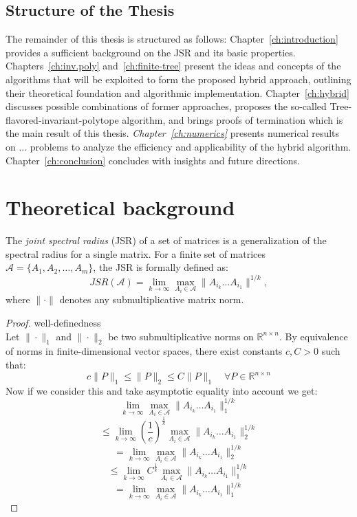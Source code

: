 \subsection*{Structure of the Thesis}
The remainder of this thesis is structured as follows: Chapter~\ref{ch:introduction} provides a sufficient background on the JSR and its basic properties. Chapters~\ref{ch:inv.poly} and~\ref{ch:finite-tree} present the ideas and concepts of the algorithms that will be exploited to form the proposed hybrid approach, outlining their theoretical foundation and algorithmic implementation. Chapter~\ref{ch:hybrid} discusses possible combinations of former approaches, proposes the so-called Tree-flavored-invariant-polytope algorithm, and brings proofs of termination which is the main result of this thesis. \emph{Chapter~\ref{ch:numerics}} presents numerical results on ... problems to analyze the efficiency and applicability of the hybrid algorithm. Chapter~\ref{ch:conclusion} concludes with insights and future directions.

\section{Theoretical background}

The \emph{joint spectral radius} (JSR) of a set of matrices is a generalization of the spectral radius for a single matrix. For a finite set of matrices $\mathcal{A} = \{A_1, A_2, \dots, A_m\}$, the JSR is formally defined as:
\begin{equation}
    JSR(\mathcal{A}) = \lim_{k \to \infty} \max_{A_i \in \mathcal{A}} \|A_{i_k} \dots A_{i_1}\|^{1/k},
\end{equation}
where $\|\cdot\|$ denotes any submultiplicative matrix norm.

\begin{proof}{well-definedness\\}
Let $\| \cdot \|_1$   and $ \| \cdot \|_2 $ be two submultiplicative norms on $ \mathbb{R}^{n \times n} $. By equivalence of norms in finite-dimensional vector spaces, there exist constants $ c, C > 0 $ such that:
$$
c \|P\|_1 \leq \|P\|_2 \leq C \|P\|_1 \quad \forall P \in \mathbb{R}^{n \times n}
$$
Now if we consider this and take asymptotic equality into account we get: 
$$
\lim_{k \to \infty} \max_{A_i \in \mathcal{A}} \|A_{i_k} \dots A_{i_1}\|_{1}^{1/k} 
$$
$$
\le \lim_{k \to \infty} {(\frac{1}{c})}^{\frac{1}{k}} \max_{A_i \in \mathcal{A}} \|A_{i_k} \dots A_{i_1}\|_{2}^{1/k} 
$$
$$
= \lim_{k \to \infty} \max_{A_i \in \mathcal{A}} \|A_{i_k} \dots A_{i_1}\|_{2}^{1/k} 
$$
$$
\le \lim_{k \to \infty} {C}^{\frac{1}{k}} \max_{A_i \in \mathcal{A}} \|A_{i_k} \dots A_{i_1}\|_{1}^{1/k}
$$
$$
= \lim_{k \to \infty} \max_{A_i \in \mathcal{A}} \|A_{i_k} \dots A_{i_1}\|_{1}^{1/k}
$$
\end{proof}

